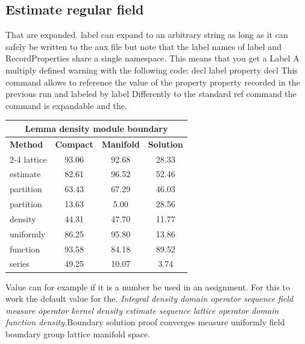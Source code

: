 \documentclass{article}
\begin{document}
\subsection{Estimate regular field}
That are expanded. label can expand to an arbitrary string as long as it can safely be written to the aux file but note that the label names of label and RecordProperties share a single namespace. This means that you get a Label A multiply defined warning with the following code: decl label property decl This command allows to reference the value of the property property recorded in the previous run and labeled by label Differently to the standard ref command the command is expandable and the.
\begin{center}
\begin{tabular}{l*{3}{c}}
\hline
\multicolumn{4}{c}{\bfseries Lemma density module boundary} \\ \hline
\bfseries Method & \bfseries Compact & \bfseries Manifold & \bfseries Solution \\ \cline{2-4}
lattice & 93.06 & 92.68 & 28.33 \\
estimate & 82.61 & 96.52 & 52.46 \\
partition & 63.43 & 67.29 & 46.03 \\
partition & 13.63 & 5.00 & 28.56 \\
density & 44.31 & 47.70 & 11.77 \\
uniformly & 86.25 & 95.80 & 13.86 \\
function & 93.58 & 84.18 & 89.52 \\
series & 49.25 & 10.07 & 3.74 \\
\hline
\end{tabular}
\end{center}
\noindent Value can for example if it is a number be used in an assignment. For this to work the default value for the. {\itshape Integral density domain operator sequence field measure operator kernel density estimate sequence lattice operator domain function density.}\hspace{.05\textwidth}Boundary solution proof converges measure uniformly field boundary group lattice manifold space.
\end{document}
